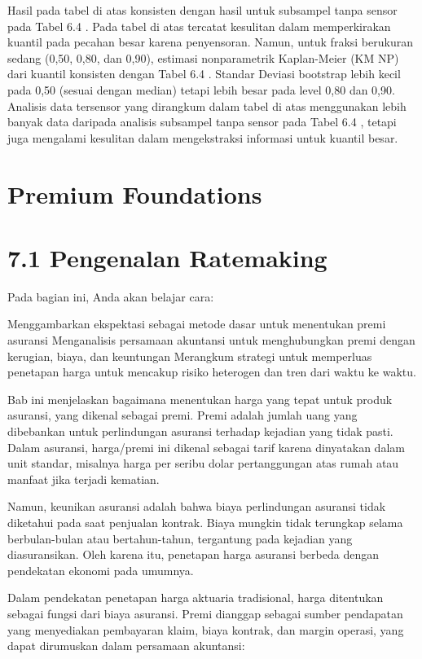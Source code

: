 \documentclass[
]{book}
\begin{document}
Hasil pada tabel di atas konsisten dengan hasil untuk subsampel tanpa sensor pada Tabel 6.4 . Pada tabel di atas tercatat kesulitan dalam memperkirakan kuantil pada pecahan besar karena penyensoran. Namun, untuk fraksi berukuran sedang (0,50, 0,80, dan 0,90), estimasi nonparametrik Kaplan-Meier (KM NP) dari kuantil konsisten dengan Tabel 6.4 . Standar Deviasi bootstrap lebih kecil pada 0,50 (sesuai dengan median) tetapi lebih besar pada level 0,80 dan 0,90. Analisis data tersensor yang dirangkum dalam tabel di atas menggunakan lebih banyak data daripada analisis subsampel tanpa sensor pada Tabel 6.4 , tetapi juga mengalami kesulitan dalam mengekstraksi informasi untuk kuantil besar.

\hypertarget{premium-foundations}{%
\chapter{Premium Foundations}\label{premium-foundations}}

\hypertarget{pengenalan-ratemaking}{%
\chapter{7.1 Pengenalan Ratemaking}\label{pengenalan-ratemaking}}

Pada bagian ini, Anda akan belajar cara:

Menggambarkan ekspektasi sebagai metode dasar untuk menentukan premi asuransi
Menganalisis persamaan akuntansi untuk menghubungkan premi dengan kerugian, biaya, dan keuntungan
Merangkum strategi untuk memperluas penetapan harga untuk mencakup risiko heterogen dan tren dari waktu ke waktu.

Bab ini menjelaskan bagaimana menentukan harga yang tepat untuk produk asuransi, yang dikenal sebagai premi. Premi adalah jumlah uang yang dibebankan untuk perlindungan asuransi terhadap kejadian yang tidak pasti. Dalam asuransi, harga/premi ini dikenal sebagai tarif karena dinyatakan dalam unit standar, misalnya harga per seribu dolar pertanggungan atas rumah atau manfaat jika terjadi kematian.

Namun, keunikan asuransi adalah bahwa biaya perlindungan asuransi tidak diketahui pada saat penjualan kontrak. Biaya mungkin tidak terungkap selama berbulan-bulan atau bertahun-tahun, tergantung pada kejadian yang diasuransikan. Oleh karena itu, penetapan harga asuransi berbeda dengan pendekatan ekonomi pada umumnya.

Dalam pendekatan penetapan harga aktuaria tradisional, harga ditentukan sebagai fungsi dari biaya asuransi. Premi dianggap sebagai sumber pendapatan yang menyediakan pembayaran klaim, biaya kontrak, dan margin operasi, yang dapat dirumuskan dalam persamaan akuntansi:
\end{document}
